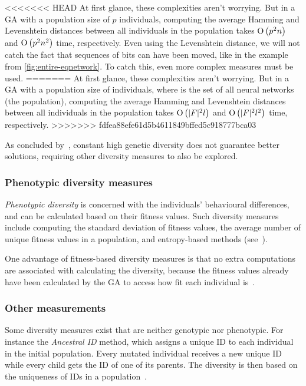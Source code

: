 <<<<<<< HEAD
At first glance, these complexities aren't worrying. But in a GA with a population size of $p$ individuals, computing the average Hamming and Levenshtein distances between all individuals in the population takes $\operatorname{O}\left(p^2 n\right)$ and $\operatorname{O}\left(p^2 n^2\right)$ time, respectively.
Even using the Levenshtein distance, we will not catch the fact that sequences of bits can have been moved, like in the example from \cref{fig:entire-eqnetwork}. To catch this, even more complex measures must be used.
=======
At first glance, these complexities aren't worrying. But in a GA with a population size of \indsetl{} individuals, where \indset{} is the set of all neural networks (the population), computing the average Hamming and Levenshtein distances between all individuals in the population takes $\operatorname{O}\left(\lvert F\rvert^2 l\right)$ and $\operatorname{O}\left(\lvert F\rvert^2 l^2\right)$ time, respectively. 
>>>>>>> fdfea88efe61d5b4611849bffed5c918777bca03

As concluded by~\cite{Darwen00doesextra}, constant high genetic diversity does not guarantee better solutions, requiring other diversity measures to also be explored.

\subsubsection{Phenotypic diversity measures}
\emph{Phenotypic diversity} is concerned with the individuals' behavioural differences, and can be calculated based on their fitness values. Such diversity measures include computing the standard deviation of fitness values, the average number of unique fitness values in a population, and entropy-based methods (see~\cite{1250187, 1266373}).

One advantage of fitness-based diversity measures is that no extra computations are associated with calculating the diversity, because the fitness values already have been calculated by the GA to access how fit each individual is~\cite{Nguyen:2006:ASPGP}.

\subsubsection{Other measurements}
Some diversity measures exist that are neither genotypic nor phenotypic. For instance the \emph{Ancestral ID} method, which assigns a unique ID to each individual in the initial population. Every mutated individual receives a new unique ID while every child gets the ID of one of its parents. The diversity is then based on the uniqueness of IDs in a population~\cite{1250187}.

